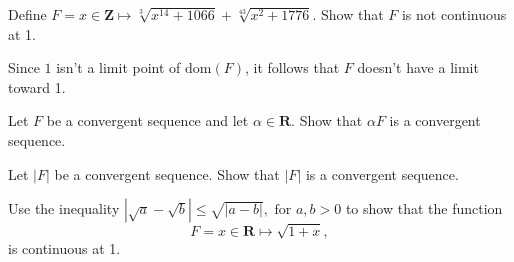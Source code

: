 \documentclass[12pt,fleqn]{exam}
\newcommand{\reals}{\mathbf{R}}
\begin{document}
\begin{questions}
\question   Define $F =  x \in \mathbf{Z} \mapsto \sqrt[3]{x^{14} + 1066} + \sqrt[43]{x^2 + 1776}.$ Show that
$F$  is not continuous at 1.

\begin{solution}
Since \(1\) isn't a limit point of \(\mbox{dom}(F)\),
it follows that \(F\) doesn't have a limit toward 1.
\end{solution}



\question  Let \(F\) be a convergent sequence and let \(\alpha \in
\reals\).  Show that \(\alpha F\) is a convergent sequence.


\question  Let \(|F| \) be a convergent sequence.  Show that \(|F| \) is a convergent sequence.
\begin{solution}

\end{solution}

\question   Use the inequality
\(
   | \sqrt{a} - \sqrt{b} | \leq \sqrt{|a -b|},\mbox{ for } a,b > 0
\)
to show that the function
\[
   F = x \in \reals \mapsto  \sqrt{1+x},
\]
is continuous at 1.

\end{questions}
\end{document}
